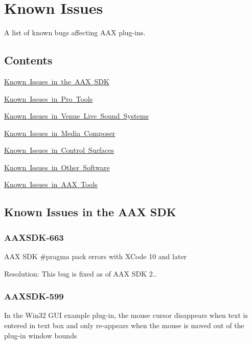 \hypertarget{a00846}{}\section{Known Issues}
\label{a00846}
A list of known bugs affecting A\+AX plug-\/ins. 

\hypertarget{a00846_knownissues_contents}{}\subsection{Contents}\label{a00846_knownissues_contents}
\begin{DoxyItemize}
\item \mbox{\hyperlink{a00846_knownissues_aaxsdk}{Known Issues in the A\+AX S\+DK}} \item \mbox{\hyperlink{a00846_knownissues_ptsw}{Known Issues in Pro Tools}} \item \mbox{\hyperlink{a00846_knownissues_venue}{Known Issues in Venue Live Sound Systems}} \item \mbox{\hyperlink{a00846_knownissues_mc}{Known Issues in Media Composer}} \item \mbox{\hyperlink{a00846_knownissues_cs}{Known Issues in Control Surfaces}} \item \mbox{\hyperlink{a00846_knownissues_other}{Known Issues in Other Software}} \item \mbox{\hyperlink{a00846_knownissues_tools}{Known Issues in A\+AX Tools}}\end{DoxyItemize}
\hypertarget{a00846_knownissues_aaxsdk}{}\subsection{Known Issues in the A\+A\+X S\+DK}\label{a00846_knownissues_aaxsdk}
\hypertarget{a00846_AAXSDK-663}{}\subsubsection{A\+A\+X\+S\+D\+K-\/663}\label{a00846_AAXSDK-663}
A\+AX S\+DK {\ttfamily \#pragma pack} errors with X\+Code 10 and later

Resolution\+: This bug is fixed as of A\+AX S\+DK 2..\hypertarget{a00846_AAXSDK-599}{}\subsubsection{A\+A\+X\+S\+D\+K-\/599}\label{a00846_AAXSDK-599}
In the Win32 G\+UI example plug-\/in, the mouse cursor disappears when text is entered in text box and only re-\/appears when the mouse is moved out of the plug-\/in window bounds

